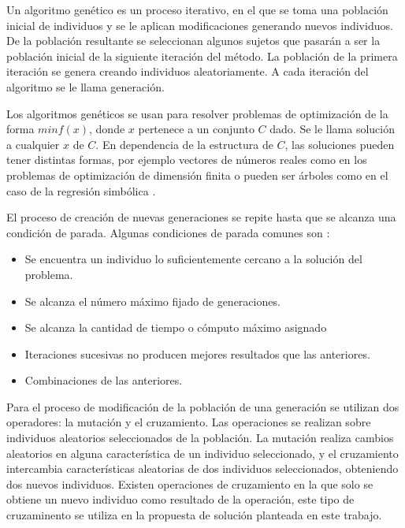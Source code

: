 Un algoritmo genético es un proceso iterativo, en el que se toma una población inicial de individuos y se le aplican modificaciones generando nuevos individuos. De la población resultante se seleccionan algunos sujetos que pasarán a ser la población inicial de la siguiente iteración del método. La población de la primera iteración se genera creando individuos aleatoriamente. A cada iteración del algoritmo se le llama generación.

Los algoritmos genéticos se usan para resolver problemas de optimización de la forma $min f(x)$, donde $x$ pertenece a un conjunto $C$ dado. Se le llama solución a cualquier $x$ de $C$. En dependencia de la estructura de $C$, las soluciones pueden tener distintas formas, por ejemplo vectores de números reales como en los problemas de optimización de dimensión finita \cite{mitchell1998introduction} o pueden ser árboles como en el caso de la regresión simbólica \cite{mitchell1998introduction}.

El proceso de creación de nuevas generaciones se repite hasta que se alcanza una condición de parada. Algunas condiciones de parada comunes son \cite{mitchell1998introduction}:

\begin{itemize}
    \item Se encuentra un individuo lo suficientemente cercano a la solución del problema.
    \item Se alcanza el número máximo fijado de generaciones.
    \item Se alcanza la cantidad de tiempo o cómputo máximo asignado
    \item Iteraciones sucesivas no producen mejores resultados que las anteriores.
    \item Combinaciones de las anteriores.
\end{itemize}

Para el proceso de modificación de la población de una generación se utilizan dos operadores: la mutación y el cruzamiento. Las operaciones se realizan sobre individuos aleatorios seleccionados de la población. La mutación realiza cambios aleatorios en alguna característica de un individuo seleccionado, y el cruzamiento intercambia características aleatorias de dos individuos seleccionados, obteniendo dos nuevos individuos. Existen operaciones de cruzamiento en la que solo se obtiene un nuevo individuo como resultado de la operación, este tipo de cruzaminento se utiliza en la propuesta de solución planteada en este trabajo.

